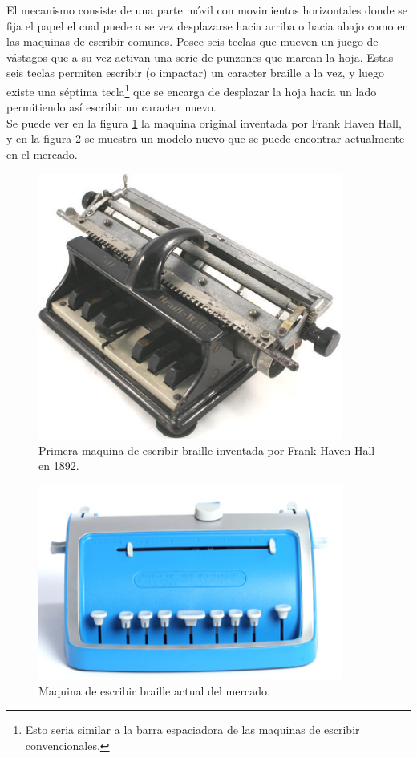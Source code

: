 El mecanismo consiste de una parte m\'ovil con movimientos horizontales donde
se
fija el papel el cual puede a se vez desplazarse hacia arriba o hacia abajo
como en las maquinas de escribir comunes. Posee seis teclas que mueven un
juego de v\'astagos que a su vez activan una serie de punzones que marcan la
hoja. Estas seis teclas permiten escribir (o impactar) un caracter braille a
la vez, y luego existe una s\'eptima tecla\footnote{Esto seria similar a la
barra espaciadora de las maquinas de escribir convencionales.} que se encarga
de
desplazar la hoja hacia un lado permitiendo as\'i escribir un caracter nuevo.\\

Se puede ver en la figura \ref{fig:hallbraille-03} la maquina original
inventada por Frank Haven Hall, y en la figura
\ref{fig:ng_perkinsaph_brailler} se muestra un modelo nuevo que se puede
encontrar actualmente en el mercado.

\begin{figure}[htp]
\centering
\includegraphics[width=10cm]{./img/hallbraille-03.png}
\caption{Primera maquina de escribir braille inventada por Frank Haven Hall
en 1892.}
\label{fig:hallbraille-03}
\end{figure}

\begin{figure}[htp]
\centering
\includegraphics[width=10cm]{./img/ng_perkinsaph_brailler.png}
\caption{Maquina de escribir braille actual del mercado.}
\label{fig:ng_perkinsaph_brailler}
\end{figure}

